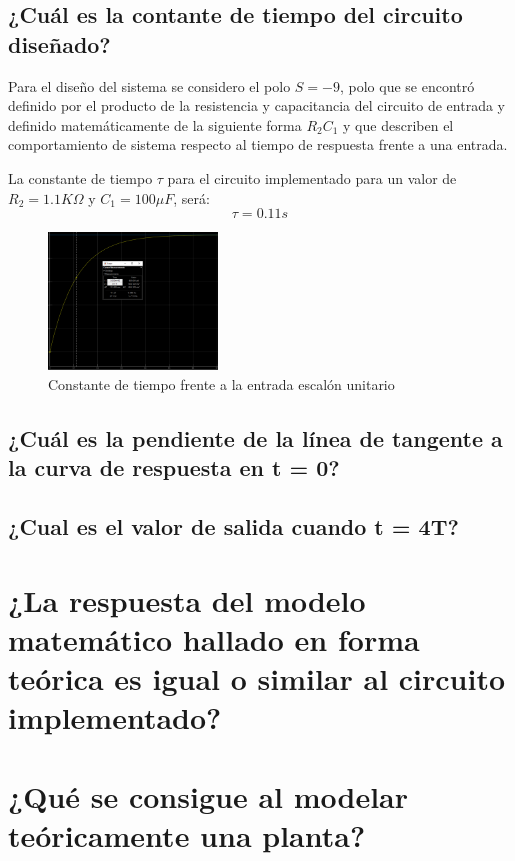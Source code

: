 \documentclass[conference]{IEEEtran}
\begin{document}
	\subsection{¿Cuál es la contante de tiempo del circuito diseñado?}
	Para el diseño del sistema se considero el polo $S = -9$, polo que se encontró definido por el producto de la resistencia y capacitancia del circuito de entrada y definido matemáticamente de la siguiente forma $ R_2C_1 $ y que describen el comportamiento de sistema respecto al tiempo de respuesta frente a una entrada.
	
	La constante de tiempo $\tau$ para el circuito implementado para un valor de $R_2 = 1.1K\varOmega $ y $C_1 = 100\mu F$, será: 
	\begin{equation}
		\tau = 0.11s
	\end{equation}
	\begin{figure}[h]
		\centering
		\includegraphics[width=0.4\textwidth]{media/cons_tiempo}
		\caption{Constante de tiempo frente a la entrada escalón unitario}
		\label{fig:constiempo}
	\end{figure}
	
	\subsection{¿Cuál es la pendiente de la línea de tangente a la curva de respuesta en t = 0?}
	\subsection{¿Cual es el valor de salida cuando t = 4T?}
	\section{¿La respuesta del modelo matemático hallado en forma teórica es igual o similar al circuito implementado?
	}
	\section{¿Qué se consigue al modelar teóricamente una planta?}
	
	
	
	
\end{document}

